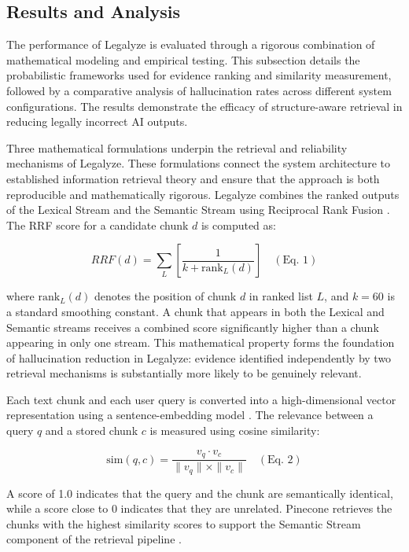\documentclass[a4paper,fleqn]{cas-dc}
\begin{document}
\subsection{Results and Analysis}
The performance of Legalyze is evaluated through a rigorous combination of mathematical modeling and empirical testing. This subsection details the probabilistic frameworks used for evidence ranking and similarity measurement, followed by a comparative analysis of hallucination rates across different system configurations. The results demonstrate the efficacy of structure-aware retrieval in reducing legally incorrect AI outputs.

Three mathematical formulations underpin the retrieval and reliability mechanisms of Legalyze. These formulations connect the system architecture to established information retrieval theory and ensure that the approach is both reproducible and mathematically rigorous. Legalyze combines the ranked outputs of the Lexical Stream and the Semantic Stream using Reciprocal Rank Fusion \citep{5}. The RRF score for a candidate chunk $d$ is computed as:

\begin{equation}
RRF(d) = \sum_{L} \left[ \frac{1}{k + \text{rank}_L(d)} \right] \quad (\text{Eq. 1})
\end{equation}

where $\text{rank}_L(d)$ denotes the position of chunk $d$ in ranked list $L$, and $k = 60$ is a standard smoothing constant. A chunk that appears in both the Lexical and Semantic streams receives a combined score significantly higher than a chunk appearing in only one stream. This mathematical property forms the foundation of hallucination reduction in Legalyze: evidence identified independently by two retrieval mechanisms is substantially more likely to be genuinely relevant.

Each text chunk and each user query is converted into a high-dimensional vector representation using a sentence-embedding model \citep{33}. The relevance between a query $q$ and a stored chunk $c$ is measured using cosine similarity:

\begin{equation}
\text{sim}(q, c) = \frac{v_q \cdot v_c}{\|v_q\| \times \|v_c\|} \quad (\text{Eq. 2})
\end{equation}

A score of 1.0 indicates that the query and the chunk are semantically identical, while a score close to 0 indicates that they are unrelated. Pinecone retrieves the chunks with the highest similarity scores to support the Semantic Stream component of the retrieval pipeline \citep{32}.
\end{document}

